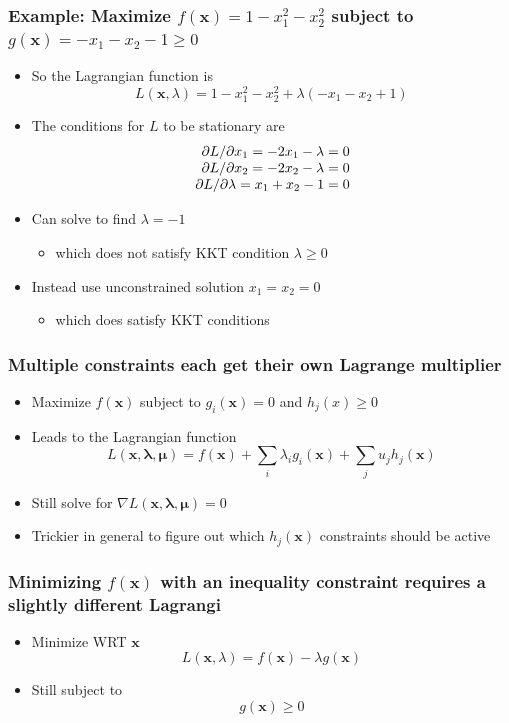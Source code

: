 \documentclass[12pt,notes,mathserif]{beamer}
\begin{document}
\begin{frame}[c]
\frametitle{Example: Maximize $f(\bm{x})=1-x_1^2-x_2^2$ subject to $g(\bm{x})=-x_1-x_2-1\geqslant{}0$}
\begin{itemize}
\item So the Lagrangian function is 
\[
L(\bm{x},\lambda)=1-x_1^2-x_2^2+\lambda(-x_1-x_2+1)
\]
\item The conditions for $L$ to be stationary are 
\[
\begin{array}{r@{~}l}
\partial L/\partial x_1=-2x_1-\lambda=0\\
\partial L/\partial x_2=-2x_2-\lambda=0\\
\partial L/\partial \lambda=x_1+x_2-1=0\\
\end{array}
\]
\item Can solve to find $\lambda=-1$
\begin{itemize}
\item which does not satisfy KKT condition $\lambda \geqslant{}0$
\end{itemize}
\item Instead use unconstrained solution $x_1=x_2=0$
\begin{itemize}
\item which does satisfy KKT conditions
\end{itemize}
\end{itemize}
\end{frame}


\begin{frame}[c]
\frametitle{Multiple constraints each get their own Lagrange multiplier}
\begin{itemize}
\item Maximize $f(\bm{x})$ subject to $g_i(\bm{x})= 0$ and $h_j(x)\geqslant{}0$
\item Leads to the Lagrangian function
\[
L(\bm{x,\lambda,\mu})=f(\bm{x})+\sum_i \lambda_ig_i(\bm{x})+\sum_ju_jh_j(\bm{x})
\]
\item Still solve for $\nabla L(\bm{x,\lambda,\mu})= 0$
\item Trickier in general to figure out which $h_j(\bm{x})$ constraints should be active
\end{itemize}
\end{frame}



\begin{frame}[c]
\frametitle{Minimizing $f(\bm{x})$ with an inequality constraint requires a slightly different Lagrangi}
\begin{itemize}
\item Minimize WRT $\bm{x}$
\[
L(\bm{x},\lambda)=f(\bm{x})-\lambda g(\bm{x})
\]
\item Still subject to
\[
g(\bm{x})\geqslant{}0
\]
\end{itemize}
\end{frame}
\end{document}
